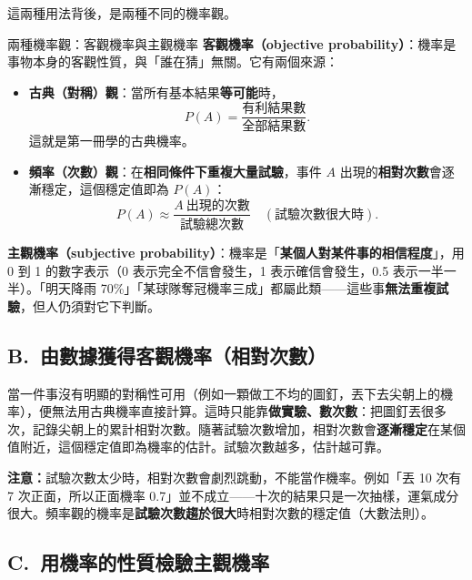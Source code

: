 \documentclass[11pt]{article}
\begin{document}
這兩種用法背後，是兩種不同的機率觀。

\begin{補充框}{兩種機率觀：客觀機率與主觀機率}
\textbf{客觀機率（objective probability）}：機率是事物本身的客觀性質，與「誰在猜」無關。它有兩個來源：
\begin{itemize}\setlength{\itemsep}{1pt}
\item \textbf{古典（對稱）觀}：當所有基本結果\textbf{等可能}時，
$$P(A)=\frac{\text{有利結果數}}{\text{全部結果數}}.$$
這就是第一冊學的古典機率。
\item \textbf{頻率（次數）觀}：在\textbf{相同條件下重複大量試驗}，事件 $A$ 出現的\textbf{相對次數}會逐漸穩定，這個穩定值即為 $P(A)$：
$$P(A)\approx \frac{A\ \text{出現的次數}}{\text{試驗總次數}}\quad(\text{試驗次數很大時}).$$
\end{itemize}

\textbf{主觀機率（subjective probability）}：機率是「\textbf{某個人對某件事的相信程度}」，用 0 到 1 的數字表示（0 表示完全不信會發生，1 表示確信會發生，0.5 表示一半一半）。「明天降雨 70\%」「某球隊奪冠機率三成」都屬此類——這些事\textbf{無法重複試驗}，但人仍須對它下判斷。
\end{補充框}

\subsection*{\sffamily B.\ 由數據獲得客觀機率（相對次數）}

當一件事沒有明顯的對稱性可用（例如一顆做工不均的圖釘，丟下去尖朝上的機率），便無法用古典機率直接計算。這時只能靠\textbf{做實驗、數次數}：把圖釘丟很多次，記錄尖朝上的累計相對次數。隨著試驗次數增加，相對次數會\textbf{逐漸穩定}在某個值附近，這個穩定值即為機率的估計。試驗次數越多，估計越可靠。

\textbf{注意：}試驗次數太少時，相對次數會劇烈跳動，不能當作機率。例如「丟 10 次有 7 次正面，所以正面機率 0.7」並不成立——十次的結果只是一次抽樣，運氣成分很大。頻率觀的機率是\textbf{試驗次數趨於很大}時相對次數的穩定值（大數法則）。


\subsection*{\sffamily C.\ 用機率的性質檢驗主觀機率}
\end{document}

